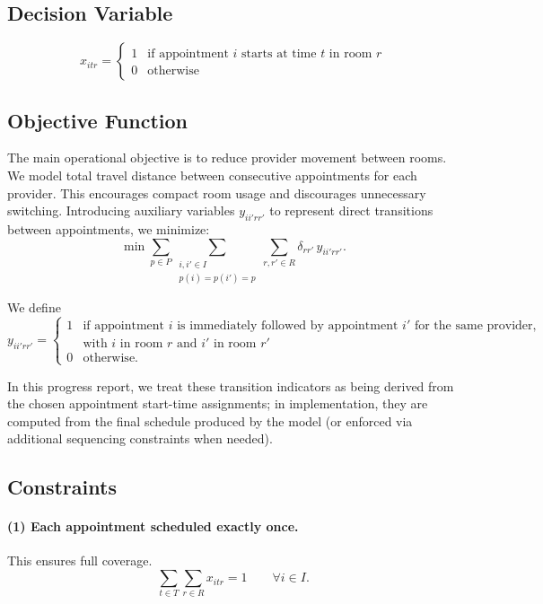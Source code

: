 \documentclass[12pt]{article}
\begin{document}
\subsection*{Decision Variable}
\[
  x_{itr} =
  \begin{cases}
    1 & \text{if appointment } i \text{ starts at time } t \text{ in room } r \\
    0 & \text{otherwise}
  \end{cases}
\]

\subsection*{Objective Function}

The main operational objective is to reduce provider movement between rooms. We model total
travel distance between consecutive appointments for each provider. This encourages compact room
usage and discourages unnecessary switching. Introducing auxiliary variables $y_{ii'rr'}$ to represent
direct transitions between appointments, we minimize:
\[
  \min \sum_{p \in P} \sum_{\substack{i,i' \in I \\ p(i)=p(i')=p}} \sum_{r,r' \in R} \delta_{rr'}\, y_{ii'rr'}.
\]

We define
\[
  y_{ii'rr'} =
  \begin{cases}
    1 & \text{if appointment } i \text{ is immediately followed by appointment } i' \text{ for the same provider,} \\
      & \text{with } i \text{ in room } r \text{ and } i' \text{ in room } r' \\
    0 & \text{otherwise.}
  \end{cases}
\]

In this progress report, we treat these transition indicators as being derived from the chosen
appointment start-time assignments; in implementation, they are computed from the final schedule
produced by the model (or enforced via additional sequencing constraints when needed).

\subsection*{Constraints}

\paragraph{(1) Each appointment scheduled exactly once.}
This ensures full coverage.
\[
  \sum_{t \in T} \sum_{r \in R} x_{itr} = 1 \qquad \forall i \in I.
\]
\end{document}
